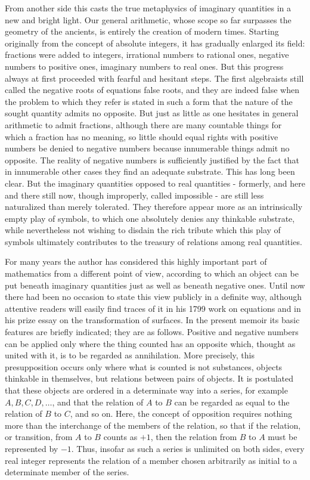 \documentclass[12pt]{article}
\begin{document}
From another side this casts the true metaphysics of imaginary quantities in a new and bright light. Our general arithmetic, whose scope so far surpasses the geometry of the ancients, is entirely the creation of modern times. Starting originally from the concept of absolute integers, it has gradually enlarged its field: fractions were added to integers, irrational numbers to rational ones, negative numbers to positive ones, imaginary numbers to real ones. But this progress always at first proceeded with fearful and hesitant steps. The first algebraists still called the negative roots of equations false roots, and they are indeed false when the problem to which they refer is stated in such a form that the nature of the sought quantity admits no opposite. But just as little as one hesitates in general arithmetic to admit fractions, although there are many countable things for which a fraction has no meaning, so little should equal rights with positive numbers be denied to negative numbers because innumerable things admit no opposite. The reality of negative numbers is sufficiently justified by the fact that in innumerable other cases they find an adequate substrate. This has long been clear. But the imaginary quantities opposed to real quantities - formerly, and here and there still now, though improperly, called impossible - are still less naturalized than merely tolerated. They therefore appear more as an intrinsically empty play of symbols, to which one absolutely denies any thinkable substrate, while nevertheless not wishing to disdain the rich tribute which this play of symbols ultimately contributes to the treasury of relations among real quantities.

For many years the author has considered this highly important part of mathematics from a different point of view, according to which an object can be put beneath imaginary quantities just as well as beneath negative ones. Until now there had been no occasion to state this view publicly in a definite way, although attentive readers will easily find traces of it in his 1799 work on equations and in his prize essay on the transformation of surfaces. In the present memoir its basic features are briefly indicated; they are as follows. Positive and negative numbers can be applied only where the thing counted has an opposite which, thought as united with it, is to be regarded as annihilation. More precisely, this presupposition occurs only where what is counted is not substances, objects thinkable in themselves, but relations between pairs of objects. It is postulated that these objects are ordered in a determinate way into a series, for example $A,B,C,D,\ldots$, and that the relation of $A$ to $B$ can be regarded as equal to the relation of $B$ to $C$, and so on. Here, the concept of opposition requires nothing more than the interchange of the members of the relation, so that if the relation, or transition, from $A$ to $B$ counts as $+1$, then the relation from $B$ to $A$ must be represented by $-1$. Thus, insofar as such a series is unlimited on both sides, every real integer represents the relation of a member chosen arbitrarily as initial to a determinate member of the series.
\end{document}
